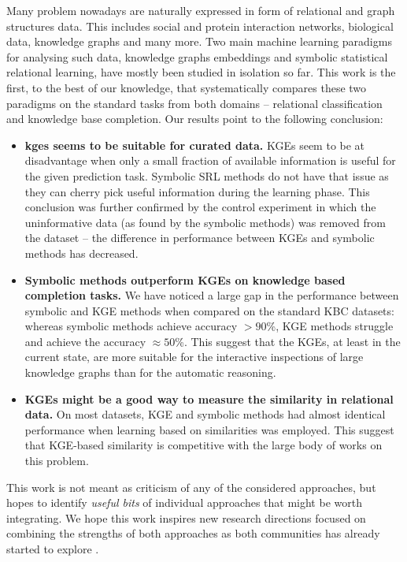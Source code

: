 Many problem nowadays are naturally expressed in form of relational and graph structures data.
This includes social and protein interaction networks, biological data, knowledge graphs and many more.
Two main machine learning paradigms for analysing such data, knowledge graphs embeddings and  symbolic statistical relational learning, have mostly been studied in isolation so far.
This work is the first, to the best of our knowledge, that systematically compares these two paradigms on the standard tasks from both domains -- relational classification and knowledge base completion.
Our results point to the following conclusion:
\begin{itemize}
	\item \textbf{\gls{kge}s seems to be suitable for curated data.}  KGEs seem to be at disadvantage when only a small fraction of available information is useful for the given prediction task. Symbolic SRL methods do not have that issue as they can cherry pick useful information during the learning phase. This conclusion was further confirmed by the control experiment in which the uninformative data (as found by the symbolic methods) was removed from the dataset -- the difference in performance between KGEs and symbolic methods has decreased.
	\item  \textbf{Symbolic methods outperform KGEs on knowledge based completion tasks.} We have noticed a large gap in the performance between symbolic and KGE methods when compared on the standard KBC datasets: whereas symbolic methods achieve accuracy $> 90$\%, KGE methods struggle and achieve the accuracy $\approx 50$\%. This suggest that the KGEs, at least in the current state, are more suitable for the interactive inspections of large knowledge graphs than for the automatic reasoning.
	\item \textbf{KGEs might be a good way to measure the similarity in relational data.} On most datasets, KGE and symbolic methods had almost identical performance when learning based on similarities was employed. This suggest that KGE-based similarity is competitive with the large body of works on this problem.
\end{itemize}

This work is not meant as criticism of any of the considered approaches, but hopes to identify \textit{useful bits} of individual approaches that might be worth integrating.
We hope this work inspires new research directions focused on combining the strengths of both approaches as both communities has already started to explore \cite{DBLP:conf/uai/MinerviniDRR17,demeester2016lifted,Schlichtkrull2017ModelingRD}.





